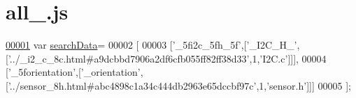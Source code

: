 \hypertarget{all__0_8js_source}{}\section{all\+\_.\+js}
\label{all__0_8js_source}

\begin{DoxyCode}
\hypertarget{all__0_8js_source.tex_l00001}{}\hyperlink{all__0_8js_ad01a7523f103d6242ef9b0451861231e}{00001} var \hyperlink{all__0_8js_ad01a7523f103d6242ef9b0451861231e}{searchData}=
00002 [
00003   [\textcolor{stringliteral}{'\_5fi2c\_5fh\_5f'},[\textcolor{stringliteral}{'\_I2C\_H\_'},[\textcolor{stringliteral}{'../\_i2\_c\_8c.html#a9dcbbd7906a2df6cfb055ff82ff38d33'},1,\textcolor{stringliteral}{'I2C.c'}]]],
00004   [\textcolor{stringliteral}{'\_5forientation'},[\textcolor{stringliteral}{'\_orientation'},[\textcolor{stringliteral}{'../sensor\_8h.html#abc4898c1a34c444db2963e65dccbf97c'},1,\textcolor{stringliteral}{'sensor.h'}]]]
00005 ];
\end{DoxyCode}
